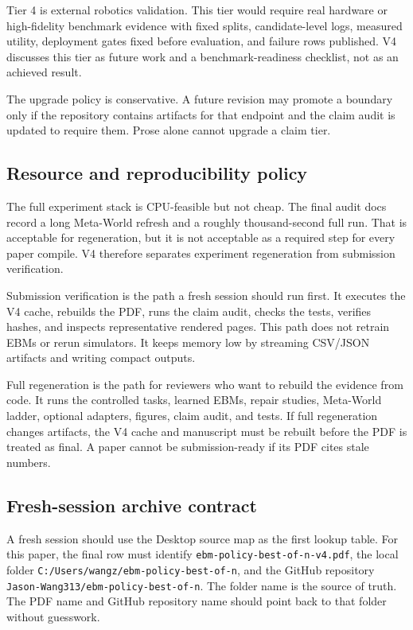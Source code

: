 Tier 4 is external robotics validation. This tier would require real hardware
or high-fidelity benchmark evidence with fixed splits, candidate-level logs,
measured utility, deployment gates fixed before evaluation, and failure rows
published. V4 discusses this tier as future work and a benchmark-readiness
checklist, not as an achieved result.

The upgrade policy is conservative. A future revision may promote a boundary
only if the repository contains artifacts for that endpoint and the claim
audit is updated to require them. Prose alone cannot upgrade a claim tier.

\subsection{Resource and reproducibility policy}
\label{app:V4-resource-policy}

The full experiment stack is CPU-feasible but not cheap. The final audit docs
record a long Meta-World refresh and a roughly thousand-second full run. That
is acceptable for regeneration, but it is not acceptable as a required step
for every paper compile. V4 therefore separates experiment regeneration from
submission verification.

Submission verification is the path a fresh session should run first. It
executes the V4 cache, rebuilds the PDF, runs the claim audit, checks the
tests, verifies hashes, and inspects representative rendered pages. This path
does not retrain EBMs or rerun simulators. It keeps memory low by streaming
CSV/JSON artifacts and writing compact outputs.

Full regeneration is the path for reviewers who want to rebuild the evidence
from code. It runs the controlled tasks, learned EBMs, repair studies,
Meta-World ladder, optional adapters, figures, claim audit, and tests. If
full regeneration changes artifacts, the V4 cache and manuscript must be
rebuilt before the PDF is treated as final. A paper cannot be submission-ready
if its PDF cites stale numbers.

\subsection{Fresh-session archive contract}
\label{app:V4-archive-contract}

A fresh session should use the Desktop source map as the first lookup table.
For this paper, the final row must identify \texttt{ebm-policy-best-of-n-v4.pdf},
the local folder \texttt{C:/Users/wangz/ebm-policy-best-of-n}, and the GitHub
repository \texttt{Jason-Wang313/ebm-policy-best-of-n}. The folder name is the
source of truth. The PDF name and GitHub repository name should point back to
that folder without guesswork.

